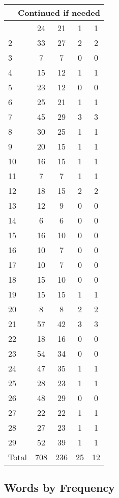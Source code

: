 \begin{center}
\begin{longtable}{l|c|c|c|c}
\hline \multicolumn{5}{|r|}{{Continued if needed}} \\ \hline
\endfoot 
1 & 24 & 21 & 1 & 1\\ \hline
2 & 33 & 27 & 2 & 2\\ \hline
3 & 7 & 7 & 0 & 0\\ \hline
4 & 15 & 12 & 1 & 1\\ \hline
5 & 23 & 12 & 0 & 0\\ \hline
6 & 25 & 21 & 1 & 1\\ \hline
7 & 45 & 29 & 3 & 3\\ \hline
8 & 30 & 25 & 1 & 1\\ \hline
9 & 20 & 15 & 1 & 1\\ \hline
10 & 16 & 15 & 1 & 1\\ \hline
11 & 7 & 7 & 1 & 1\\ \hline
12 & 18 & 15 & 2 & 2\\ \hline
13 & 12 & 9 & 0 & 0\\ \hline
14 & 6 & 6 & 0 & 0\\ \hline
15 & 16 & 10 & 0 & 0\\ \hline
16 & 10 & 7 & 0 & 0\\ \hline
17 & 10 & 7 & 0 & 0\\ \hline
18 & 15 & 10 & 0 & 0\\ \hline
19 & 15 & 15 & 1 & 1\\ \hline
20 & 8 & 8 & 2 & 2\\ \hline
21 & 57 & 42 & 3 & 3\\ \hline
22 & 18 & 16 & 0 & 0\\ \hline
23 & 54 & 34 & 0 & 0\\ \hline
24 & 47 & 35 & 1 & 1\\ \hline
25 & 28 & 23 & 1 & 1\\ \hline
26 & 48 & 29 & 0 & 0\\ \hline
27 & 22 & 22 & 1 & 1\\ \hline
28 & 27 & 23 & 1 & 1\\ \hline
29 & 52 & 39 & 1 & 1\\ \hline
\hline \hline
Total & 708 & 236 & 25 & 12



\end{longtable}
\end{center}

 
\subsection{Words by Frequency}

